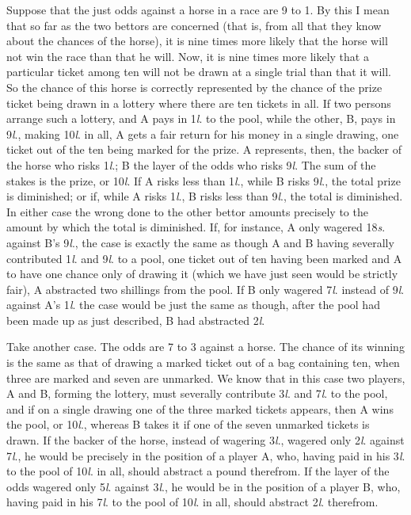 \documentclass[letterpaper,12pt,oneside,openany]{memoir}
\begin{document}
Suppose that the just odds against a horse in a race
are 9 to 1. By this I mean that so far as the two
bettors are concerned (that is, from all that they know
about the chances of the horse), it is nine times more
likely that the horse will not win the race than that he
will. Now, it is nine times more likely that a particular
ticket among ten will not be drawn at a single trial
than that it will. So the chance of this horse is correctly
represented by the chance of the prize ticket
being drawn in a lottery where there are ten tickets in
all. If two persons arrange such a lottery, and A pays
in 1\textit{l}. to the pool, while the other, B, pays in 9\textit{l}., making
10\textit{l}. in all, A gets a fair return for his money in a single
drawing, one ticket out of the ten being marked for the
prize. A represents, then, the backer of the horse who
risks 1\textit{l}.; B the layer of the odds who risks 9\textit{l}. The
sum of the stakes is the prize, or 10\textit{l}. If A risks less
than 1\textit{l}., while B risks 9\textit{l}., the total prize is diminished;
or if, while A risks 1\textit{l}., B risks less than 9\textit{l}., the total
is diminished. In either case the wrong done to the
other bettor amounts precisely to the amount by which
the total is diminished. If, for instance, A only wagered
18\textit{s}. against B's 9\textit{l}., the case is exactly the same as
though A and B having severally contributed 1\textit{l}. and
9\textit{l}. to a pool, one ticket out of ten having been marked
and A to have one chance only of drawing it (which we
have just seen would be strictly fair), A abstracted two
shillings from the pool. If B only wagered 7\textit{l}. instead
of 9\textit{l}. against A's 1\textit{l}. the case would be just the same
as though, after the pool had been made up as just described,
B had abstracted 2\textit{l}.

Take another case. The odds are 7 to 3 against a
horse. The chance of its winning is the same as that
of drawing a marked ticket out of a bag containing ten,
when three are marked and seven are unmarked. We
know that in this case two players, A and B, forming
the lottery, must severally contribute 3\textit{l}. and 7\textit{l}. to the
pool, and if on a single drawing one of the three marked
tickets appears, then A wins the pool, or 10\textit{l}., whereas
B takes it if one of the seven unmarked tickets is drawn.
If the backer of the horse, instead of wagering 3\textit{l}.,
wagered only 2\textit{l}. against 7\textit{l}., he would be precisely in
the position of a player A, who, having paid in his 3\textit{l}.
to the pool of 10\textit{l}. in all, should abstract a pound therefrom.
If the layer of the odds wagered only 5\textit{l}. against
3\textit{l}., he would be in the position of a player B, who,
having paid in his 7\textit{l}. to the pool of 10\textit{l}. in all, should
abstract 2\textit{l}. therefrom.
\end{document}
